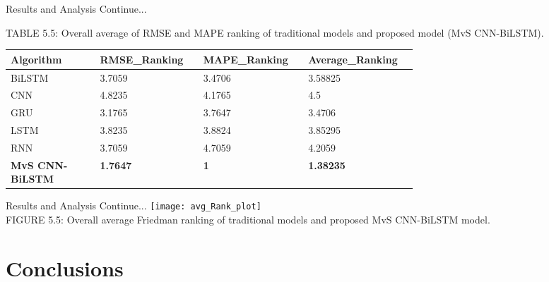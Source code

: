 \documentclass[12pt, aspectratio=169]{beamer}
\begin{document}
\begin{frame}{Results and Analysis \tiny{Continue...}}
\begin{table}
	\centering
	\scriptsize {TABLE 5.5: Overall average of RMSE and MAPE ranking of traditional models and proposed model (MvS CNN-BiLSTM).}
    \begin{tabular}[c]{ |p{0.19\linewidth} |p{0.16\linewidth}| p{0.16\linewidth} |p{0.16\linewidth}|  }
    \hline Algorithm&RMSE\_Ranking&MAPE\_Ranking&Average\_Ranking \\ \hline
    BiLSTM&3.7059&3.4706&3.58825\\
    CNN&4.8235&4.1765&4.5\\
    GRU&3.1765&3.7647&3.4706\\
    LSTM&3.8235&3.8824&3.85295\\
    RNN&3.7059&4.7059&4.2059\\
    \textbf{MvS CNN-BiLSTM}&\textbf{1.7647}&\textbf{1}&\textbf{1.38235} \\\hline
    \end{tabular}
    \end{table}
\end{frame}

\begin{frame}{Results and Analysis \tiny{Continue...}}
	\centering
	\texttt{[image: avg\_Rank\_plot]}\\
	\scriptsize{FIGURE 5.5: Overall average Friedman ranking of traditional models and proposed MvS CNN-BiLSTM model.}
\end{frame}
\section{Conclusions}
\end{document}
